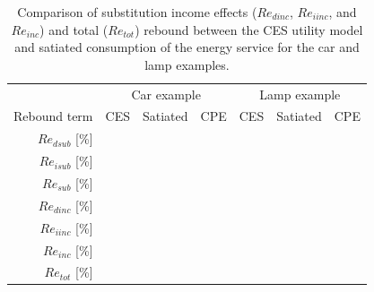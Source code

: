 \documentclass[12pt]{article}\usepackage[]{graphicx}\usepackage[]{xcolor}
\begin{document}
\begin{table}
\footnotesize
\centering
\caption{Comparison of substitution
         income effects
         ($Re_{dinc}$, $Re_{iinc}$, and $Re_{inc}$) and
         total ($Re_{tot}$) rebound
         between
         the CES utility model and satiated
         consumption of the energy service for the
         car and lamp examples.}
\label{tab:utility_model_comparison}
\begin{tabular}{r r r r r r r}
\toprule
                 & \multicolumn{3}{c}{Car example}
                                                & \multicolumn{3}{c}{Lamp example} \\
Rebound term     & CES & Satiated & CPE         & CES & Satiated & CPE             \\
\midrule
$Re_{dsub}$ [\%] &     &          &             &     &          &                 \\
$Re_{isub}$ [\%] &     &          &             &     &          &                 \\
\midrule
$Re_{sub}$ [\%]  &     &          &             &     &          &                 \\
\midrule
$Re_{dinc}$ [\%] & 
                       & 
                                  &
                                                & 
                                                      & 
                                                                 &               \\
$Re_{iinc}$ [\%] & 
                       & 
                                  &
                                                & 
                                                      & 
                                                                 &                \\
\midrule
$Re_{inc}$ [\%] & 
                       & 
                                  &
                                                & 
                                                      & 
                                                                 &                \\
\midrule
$Re_{tot}$ [\%] & 
                       & 
                                  &
                                                & 
                                                      & 
                                                                 &                \\
\bottomrule
\end{tabular}
\end{table}
\end{document}
